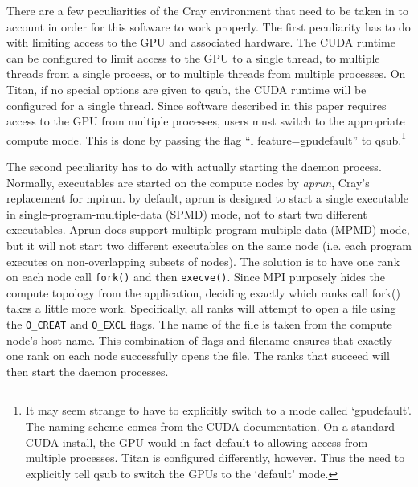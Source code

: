 There are a few peculiarities of the Cray environment that need to be taken in to account in order for this software to work properly.  The first peculiarity has to do with limiting access to the GPU and associated hardware.  The CUDA runtime can be configured to limit access to the GPU to a single thread, to multiple threads from a single process, or to multiple threads from multiple processes.  On Titan, if no special options are given to qsub, the CUDA runtime will be configured for a single thread.  Since software described in this paper requires access to the GPU from multiple processes, users must switch to the appropriate compute mode.  This is done by passing the flag ``l feature=gpudefault'' to qsub.\footnote{It may seem strange to have to explicitly switch to a mode called `gpudefault'.  The naming scheme comes from the CUDA documentation.  On a standard CUDA install, the GPU would in fact default to allowing access from multiple processes.  Titan is configured differently, however.  Thus the need to explicitly tell qsub to switch the GPUs to the `default' mode.}

The second peculiarity has to do with actually starting the daemon process.  Normally, executables are started on the compute nodes by \emph{aprun}, Cray's replacement for mpirun.  by default, aprun is designed to start a single executable in single-program-multiple-data (SPMD) mode, not to start two different executables.  Aprun does support multiple-program-multiple-data (MPMD) mode, but it will not start two different executables on the same node (i.e. each program executes on non-overlapping subsets of nodes).  The solution is to have one rank on each node call \texttt{fork()} and then \texttt{execve()}.  Since MPI purposely hides the compute topology from the application, deciding exactly which ranks call fork() takes a little more work.  Specifically, all ranks will attempt to open a file using the \texttt{O\_CREAT} and 
\texttt{O\_EXCL} flags.  The name of the file is taken from the compute node's host name.  This combination of flags and filename ensures that exactly one rank on each node successfully opens the file.  The ranks that succeed will then start the daemon processes.

